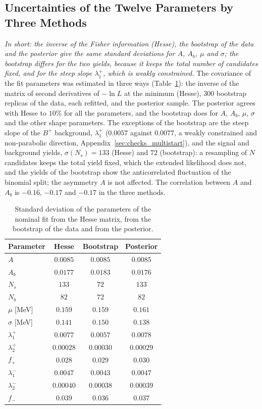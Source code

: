 \subsection{Uncertainties of the Twelve Parameters by Three Methods}
\label{sec:checks_covariance}
\emph{In short: the inverse of the Fisher information (Hesse), the bootstrap of the data and the posterior give the same standard deviations for $A$, $A_b$, $\mu$ and $\sigma$; the bootstrap differs for the two yields, because it keeps the total number of candidates fixed, and for the steep slope $\lambda_1^+$, which is weakly constrained.}
The covariance of the fit parameters was estimated in three ways (Table~\ref{tab:checks_covariance}): the inverse of the matrix of second derivatives of $-\ln L$ at the minimum (Hesse), $300$ bootstrap replicas of the data, each refitted, and the posterior sample. The posterior agrees with Hesse to $10\%$ for all the parameters, and the bootstrap does for $A$, $A_b$, $\mu$, $\sigma$ and the other shape parameters. The exceptions of the bootstrap are the steep slope of the $B^+$ background, $\lambda_1^+$ ($0.0057$ against $0.0077$, a weakly constrained and non-parabolic direction, Appendix~\ref{sec:checks_multistart}), and the signal and background yields, $\sigma(N_s)=133$ (Hesse) and $72$ (bootstrap): a resampling of $N$ candidates keeps the total yield fixed, which the extended likelihood does not, and the yields of the bootstrap show the anticorrelated fluctuation of the binomial split; the asymmetry $A$ is not affected. The correlation between $A$ and $A_b$ is $-0.16$, $-0.17$ and $-0.17$ in the three methods.

\begin{table}[h]
\centering
\begin{tabular}{lccc}
\toprule
Parameter & Hesse & Bootstrap & Posterior \\
\midrule
$A$ & $0.0085$ & $0.0085$ & $0.0085$ \\
$A_b$ & $0.0177$ & $0.0183$ & $0.0176$ \\
$N_s$ & $133$ & $72$ & $133$ \\
$N_b$ & $82$ & $72$ & $82$ \\
$\mu$ [MeV] & $0.159$ & $0.159$ & $0.161$ \\
$\sigma$ [MeV] & $0.141$ & $0.150$ & $0.138$ \\
$\lambda_1^+$ & $0.0077$ & $0.0057$ & $0.0078$ \\
$\lambda_2^+$ & $0.00028$ & $0.00030$ & $0.00029$ \\
$f_+$ & $0.028$ & $0.029$ & $0.030$ \\
$\lambda_1^-$ & $0.0047$ & $0.0043$ & $0.0047$ \\
$\lambda_2^-$ & $0.00040$ & $0.00038$ & $0.00039$ \\
$f_-$ & $0.039$ & $0.036$ & $0.037$ \\
\bottomrule
\end{tabular}
\caption{Standard deviation of the parameters of the nominal fit from the Hesse matrix, from the bootstrap of the data and from the posterior.}
\label{tab:checks_covariance}
\end{table}

